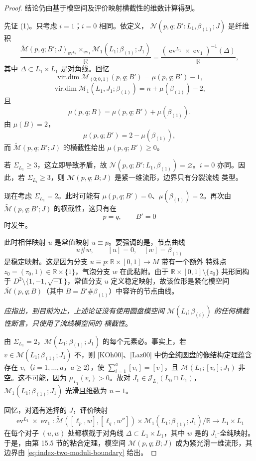 \begin{proof}
结论仍由基于模空间及评价映射横截性的维数计算得到。

先证 (1)。只考虑 $i=1$；$i=0$ 相同。依定义，
$\mathcal N(p,q;B':L_1,\beta_{(1)};J)$ 是纤维积
\[
 \frac{\widetilde{\mathcal M}(p,q;B';J)_{\operatorname{ev}^{L_1}}
 \times_{\operatorname{ev}_1}\mathcal M_1(L_1;\beta_{(1)};J_1)}{\mathbb R}
 =\frac{(\operatorname{ev}^{L_1}\times\operatorname{ev}_1)^{-1}(\Delta)}
 {\mathbb R},
\]
其中 $\Delta\subset L_1\times L_1$ 是对角线。回忆
\[
 \operatorname{vir.dim}\mathcal M_{(0;0,1)}(p,q;B')=\mu(p,q;B')-1,
\]
\[
 \operatorname{vir.dim}\mathcal M_1(L_1,J_1;\beta_{(1)})
 =n+\mu(\beta_{(1)})-2,
\]
且
\[
 \mu(p,q;B)=\mu(p,q;B')+\mu(\beta_{(1)}).
\]
由 $\mu(B)=2$，
\[
 \mu(p,q;B')=2-\mu(\beta_{(1)}),
\]
而 $\widetilde{\mathcal M}(p,q;B';J)$ 的横截性给出
$\mu(p,q;B')\geq0$。

若 $\Sigma_{L_1}\geq3$，这立即导致矛盾，故
$\mathcal N(p,q;B':L_1,\beta_{(1)})=\varnothing$。$i=0$ 亦同。因此，若
$\Sigma_{L_i}\geq3$，则 $\mathcal M(p,q;B;J)$ 是紧一维流形，边界只有分裂流线
类型。

现在考虑 $\Sigma_{L_1}=2$。此时可能有
$\mu(p,q;B')=0$、$\mu(\beta_{(1)})=2$。再次由
$\widetilde{\mathcal M}(p,q;B';J)$ 的横截性，这只有在
\[
 p=q,\qquad B'=0
\]
时发生。

\begin{remark}
\label{rem:constant-strip-with-disc-bubble-stable}
此时相伴映射 $u$ 是常值映射 $u\equiv p$。要强调的是，节点曲线
\[
 u\#w,\qquad [u]=0,\quad[w]=\beta_{(1)}
\]
是稳定映射。这是因为分支 $u\equiv p:\mathbb R\times[0,1]\to M$ 带有一个额外
特殊点 $z_0=(\tau_0,1)\in\mathbb R\times\{1\}$，气泡分支 $w$ 在此黏附。由于
$\mathbb R\times[0,1]\setminus\{z_0\}$ 共形同构于
$D^2\setminus\{1,-1,\sqrt{-1}\}$，常值分支 $u$ 定义稳定映射，故该位形是紧化\personFloer{}模空间 $\overline{\mathcal M}(p,q;B)$（其中
$B=B'\#\beta_{(1)}$）中容许的节点曲线。

\emph{应指出，到目前为止，上述论证没有使用圆盘模空间
$\mathcal M(L_i;\beta_{(i)})$ 的任何横截性断言，只使用了\personFloer{}流线模空间的
横截性}。
\end{remark}

由 $\Sigma_{L_1}=2$，$\mathcal M(L_1;\beta_{(1)};J_1)$ 的每个元素必\termSomewhereInjective{}。事实上，若
$v\in\mathcal M(L_1;\beta_{(1)};J_1)$ 不\termSomewhereInjective{}，则
[KOh00]、[Laz00] 中伪全纯圆盘的像结构定理蕴含存在
$v_i$（$i=1,\ldots,a$，$a\geq2$），使
$\sum_{i=1}^a[v_i]=[v]$，且 $\mathcal M(L_1;[v_i];J_1)$ 非空。这不可能，因为
$\mu_{L_1}(v_i)>0$。故对
$J_1\in\mathcal J_{L_1}(L_0\cap L_1)$，
$\mathcal M_1(L_1;\beta_{(1)};J_1)$ 光滑且维数为 $n-1$。

回忆，对通有选择的 $J$，评价映射
\[
 \operatorname{ev}^{L_1}\times\operatorname{ev}_1:
 \widetilde{\mathcal M}([\ell_p,w],[\ell_q,w''])
 \times\mathcal M_1(L_1;\beta_{(1)};J_1)/\mathbb R
 \longrightarrow L_1\times L_1
\]
在每个对子 $(u,w)$ 处都横截于对角线
$\Delta\subset L_1\times L_1$，其中 $w$ 是\termSomewhereInjective{}的
$J_1$-全纯映射。于是，由第 15.5 节的粘合定理，模空间
$\mathcal M(p,q;B;J)$ 成为紧光滑一维流形，其边界由
\eqref{eq:index-two-moduli-boundary} 给出。
\end{proof}

